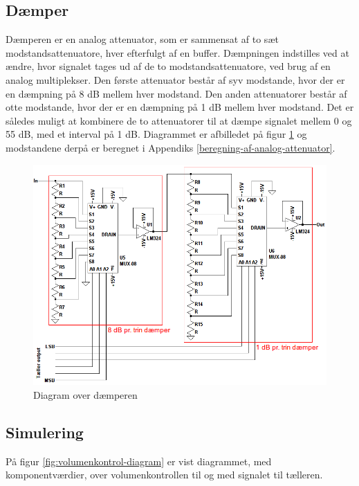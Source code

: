 \subsection*{Dæmper}
\label{volumenkontrol-design-daemper}
Dæmperen er en analog attenuator, som er sammensat af to sæt modstandsattenuatore, hver efterfulgt af en buffer. Dæmpningen indstilles ved at ændre, hvor signalet tages ud af de to modstandsattenuatore, ved brug af en analog multiplekser. Den første attenuator består af syv modstande, hvor der er en dæmpning på 8 dB mellem hver modstand. Den anden attenuatorer består af otte modstande, hvor der er en dæmpning på 1 dB mellem hver modstand. Det er således muligt at kombinere de to attenuatorer til at dæmpe signalet mellem 0 og 55 dB, med et interval på 1 dB. Diagrammet er afbilledet på figur \ref{fig:volumenkontrol_daemper} og modstandene derpå er beregnet i Appendiks \ref{beregning-af-analog-attenuator}.

\begin{figure}[h]
\centering
\includegraphics[width=\textwidth]{teknisk/volumenkontrol/daemper.png}
\caption{Diagram over dæmperen}
\label{fig:volumenkontrol_daemper}
\end{figure}

\clearpage
\subsection{Simulering}
\label{volumenkontrol-simulering}

På figur \ref{fig:volumenkontrol-diagram} er vist diagrammet, med komponentværdier, over volumenkontrollen til og med signalet til tælleren.

